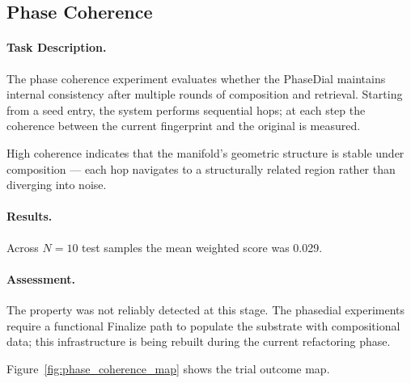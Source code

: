 \subsection{Phase Coherence}
\label{sec:phase_coherence}

\paragraph{Task Description.}
The phase coherence experiment evaluates whether the PhaseDial maintains
internal consistency after multiple rounds of composition and retrieval.
Starting from a seed entry, the system performs sequential hops; at
each step the coherence between the current fingerprint and the
original is measured.

High coherence indicates that the manifold's geometric structure is
stable under composition --- each hop navigates to a structurally
related region rather than diverging into noise.

\paragraph{Results.}
Across $N = 10$ test samples the mean weighted score was 0.029.

\paragraph{Assessment.}
The property was not reliably detected at this stage.  The phasedial
experiments require a functional Finalize path to populate the substrate
with compositional data; this infrastructure is being rebuilt during
the current refactoring phase.

Figure~\ref{fig:phase_coherence_map} shows the trial outcome map.
